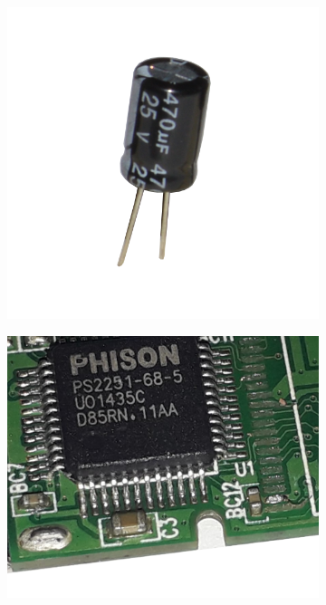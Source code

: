 \documentclass[12pt]{article}
\begin{document}
\begin{figure}[h!]
  \centering
  \begin{subfigure}[b]{0.3\linewidth}
    \includegraphics[width=\linewidth]{data/condensatore-reale.jpg}
  \end{subfigure}
  \begin{subfigure}[b]{0.3\linewidth}
    \includegraphics[width=\linewidth]{data/PCB-capacitor.png}
  \end{subfigure}
  

\end{figure}
\end{document}

